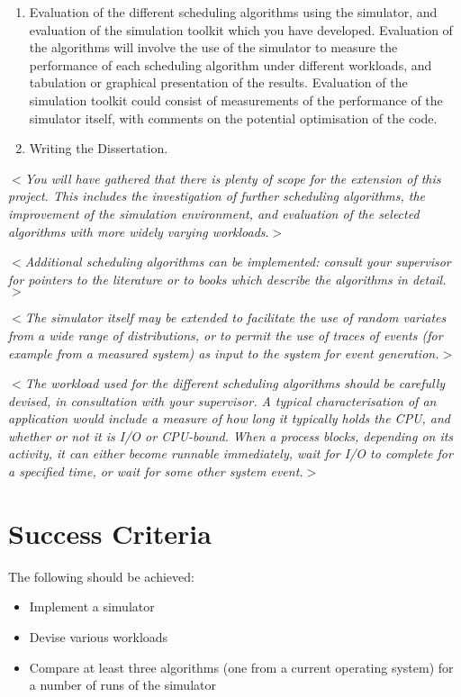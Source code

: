 \documentclass[12pt]{article}
\newcommand{\al}{$<$}
\newcommand{\ar}{$>$}
\begin{document}
\begin{enumerate}
\item Evaluation of the different scheduling algorithms using the
  simulator, and evaluation of the simulation toolkit which you have
  developed.   Evaluation of the algorithms will involve the use of
  the simulator to measure the performance of each scheduling
  algorithm under different workloads, and tabulation or graphical
  presentation of the results.  Evaluation of the simulation toolkit
  could consist of measurements of the performance of the simulator
  itself, with comments on the potential optimisation of the code. 

\item Writing the Dissertation.

\end{enumerate}

\al\emph{You will have gathered that there is plenty of scope for the
  extension of this project.  This includes the investigation of
  further scheduling algorithms, the improvement of the simulation
  environment, and evaluation of the selected algorithms with more
  widely varying workloads}.\ar

\al\emph{Additional scheduling algorithms can be implemented: consult
  your supervisor for pointers to the literature or to books which
  describe the algorithms in detail.}\ar


\al\emph{The simulator itself may be extended to facilitate the use of
  random variates from a wide range of distributions, or to permit the
  use of traces of events (for example from a measured system) as
  input to the system for event generation.}\ar


\al\emph{The workload used for the different scheduling algorithms
  should be carefully devised, in consultation with your
  supervisor. A typical characterisation of an application would
  include a measure of how long it typically holds the CPU, and
  whether or not it is I/O or CPU-bound.  When a process blocks,
  depending on its activity, it can either become runnable
  immediately, wait for I/O to complete for a specified time, or wait
  for some other system event.}\ar


\section*{Success Criteria}

The following should be achieved:

\begin{itemize}

\item Implement a simulator

\item Devise various workloads

\item Compare at least three algorithms (one from a current operating
  system) for a number of runs of the simulator

\end{itemize}
\end{document}
